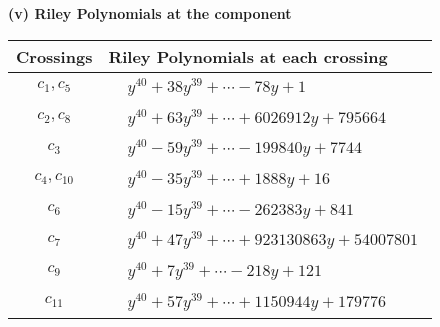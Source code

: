 \documentclass[1p]{elsarticle_modified}
\theoremstyle{definition}
\begin{document}
\newpage\renewcommand{\arraystretch}{1}
\flushleft \textbf{(v) Riley Polynomials at the component}\newline \\
\begin{tabular}{m{50pt}|m{274pt}}
Crossings & \hspace{64pt}Riley Polynomials at each crossing \\
\hline $$\begin{aligned}c_{1},c_{5}\end{aligned}$$&$\begin{aligned}
&y^{40}+38 y^{39}+\cdots-78 y+1
\end{aligned}$\\
\hline $$\begin{aligned}c_{2},c_{8}\end{aligned}$$&$\begin{aligned}
&y^{40}+63 y^{39}+\cdots+6026912 y+795664
\end{aligned}$\\
\hline $$\begin{aligned}c_{3}\end{aligned}$$&$\begin{aligned}
&y^{40}-59 y^{39}+\cdots-199840 y+7744
\end{aligned}$\\
\hline $$\begin{aligned}c_{4},c_{10}\end{aligned}$$&$\begin{aligned}
&y^{40}-35 y^{39}+\cdots+1888 y+16
\end{aligned}$\\
\hline $$\begin{aligned}c_{6}\end{aligned}$$&$\begin{aligned}
&y^{40}-15 y^{39}+\cdots-262383 y+841
\end{aligned}$\\
\hline $$\begin{aligned}c_{7}\end{aligned}$$&$\begin{aligned}
&y^{40}+47 y^{39}+\cdots+923130863 y+54007801
\end{aligned}$\\
\hline $$\begin{aligned}c_{9}\end{aligned}$$&$\begin{aligned}
&y^{40}+7 y^{39}+\cdots-218 y+121
\end{aligned}$\\
\hline $$\begin{aligned}c_{11}\end{aligned}$$&$\begin{aligned}
&y^{40}+57 y^{39}+\cdots+1150944 y+179776
\end{aligned}$\\
\hline
\end{tabular}\\~\\
\end{document}
